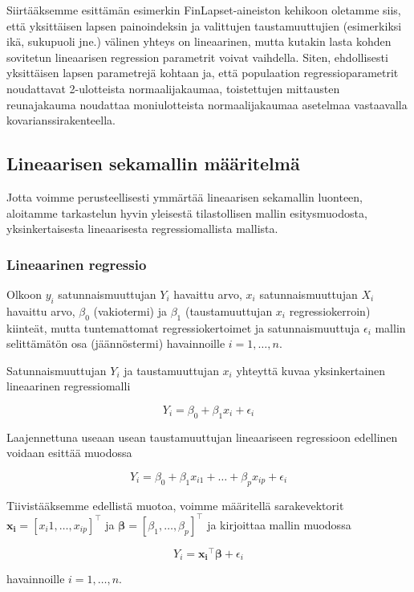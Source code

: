 \documentclass[finnish]{docopts}
\begin{document}
Siirtääksemme \cite{laird82} esittämän esimerkin FinLapset-aineiston kehikoon oletamme siis, että yksittäisen lapsen painoindeksin ja valittujen taustamuuttujien (esimerkiksi ikä, sukupuoli jne.) välinen yhteys on lineaarinen, mutta kutakin lasta kohden sovitetun lineaarisen regression parametrit voivat vaihdella. Siten, ehdollisesti yksittäisen lapsen parametrejä kohtaan ja, että populaation regressioparametrit noudattavat 2-ulotteista normaalijakaumaa, toistettujen mittausten reunajakauma noudattaa moniulotteista normaalijakaumaa asetelmaa vastaavalla kovarianssirakenteella. 

\subsection{Lineaarisen sekamallin määritelmä}
\label{sub:lsmmaar}

Jotta voimme perusteellisesti ymmärtää lineaarisen sekamallin luonteen, aloitamme tarkastelun hyvin yleisestä tilastollisen mallin esitysmuodosta, yksinkertaisesta lineaarisesta regressiomallista mallista.

\subsubsection{Lineaarinen regressio}
\label{ssb:linreg}

Olkoon $y_i$ satunnaismuuttujan $Y_i$ havaittu arvo, $x_i$ satunnaismuuttujan $X_i$ havaittu arvo, $\beta_0$ (vakiotermi) ja $\beta_1$ (taustamuuttujan $x_i$ regressiokerroin) kiinteät, mutta tuntemattomat regressiokertoimet ja satunnaismuuttuja $\epsilon_i$ mallin selittämätön osa (jäännöstermi) havainnoille $i = 1,\dots,n$.

Satunnaismuuttujan $Y_i$ ja taustamuuttujan $x_i$ yhteyttä kuvaa yksinkertainen lineaarinen regressiomalli

$$
Y_i = \beta_0 + \beta_1 x_i + \epsilon_i
$$

Laajennettuna useaan usean taustamuuttujan lineaariseen regressioon edellinen voidaan esittää muodossa

$$
Y_i = \beta_0 + \beta_1 x_{i1} + \dots + \beta_p x_{ip} + \epsilon_i
$$

Tiivistääksemme edellistä muotoa, voimme määritellä sarakevektorit $\bm{x_i} = [x_i1 , \dots, x_{ip}]^\top$ ja $\bm{\beta} = [\beta_1 , \dots, \beta_{p}]^\top$ ja kirjoittaa mallin muodossa

$$
Y_i = \bm{x_i}^\top \bm{\beta} + \epsilon_i
$$

havainnoille $i = 1,\dots,n$. \\
\end{document}
